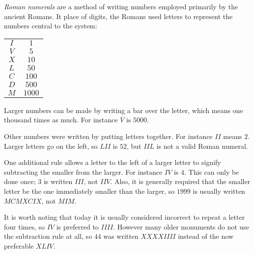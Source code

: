 \documentclass[12pt]{article}
\begin{document}
\emph{Roman numerals} are a method of writing numbers employed primarily by the ancient Romans.  It place of digits, the Romans used letters to represent the numbers central to the system:

\begin{tabular}{cc}
$I$&$1$\\
$V$&$5$\\
$X$&$10$\\
$L$&$50$\\
$C$&$100$\\
$D$&$500$\\
$M$&$1000$
\end{tabular}

Larger numbers can be made by writing a bar over the letter, which means one thousand times as much.  For instance $\overline{V}$ is $5000$.

Other numbers were written by putting letters together.  For instance $II$ means $2$.  Larger letters go on the left, so $LII$ is $52$, but $IIL$ is not a valid Roman numeral.

One additional rule allows a letter to the left of a larger letter to signify subtracting the smaller from the larger.  For instance $IV$ is $4$.  This can only be done once; $3$ is written $III$, not $IIV$.  Also, it is generally required that the smaller letter be the one immediately smaller than the larger, so $1999$ is usually written $MCMXCIX$, not $MIM$.

It is worth noting that today it is usually considered incorrect to repeat a letter four times, so $IV$ is preferred to $IIII$.  However many older monuments do not use the subtraction rule at all, so $44$ was written $XXXXIIII$ instead of the now preferable $XLIV$.
\end{document}
